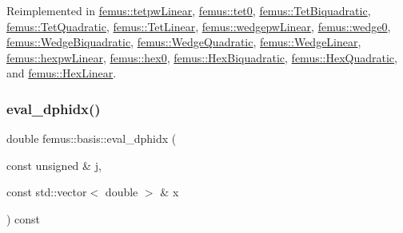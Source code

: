Reimplemented in \mbox{\hyperlink{classfemus_1_1tetpw_linear_a6b5280c580726c23a3d0557a95c39bd9}{femus\+::tetpw\+Linear}}, \mbox{\hyperlink{classfemus_1_1tet0_ab082238423f56a4a4810554511f5feb1}{femus\+::tet0}}, \mbox{\hyperlink{classfemus_1_1_tet_biquadratic_a88998aa6e589aa3919cde8c5eb1ad46d}{femus\+::\+Tet\+Biquadratic}}, \mbox{\hyperlink{classfemus_1_1_tet_quadratic_a5b0f085e16cb9e4aa9dec091d7abeed9}{femus\+::\+Tet\+Quadratic}}, \mbox{\hyperlink{classfemus_1_1_tet_linear_ad4fe543f5c2bd7fe70d3f8b0d11ddac7}{femus\+::\+Tet\+Linear}}, \mbox{\hyperlink{classfemus_1_1wedgepw_linear_a1857628ada7c64496f95bafffd40881b}{femus\+::wedgepw\+Linear}}, \mbox{\hyperlink{classfemus_1_1wedge0_a7ca29b396daf72718fc2a700b52410f0}{femus\+::wedge0}}, \mbox{\hyperlink{classfemus_1_1_wedge_biquadratic_a19df28dae2ec661641a107ae669f0f92}{femus\+::\+Wedge\+Biquadratic}}, \mbox{\hyperlink{classfemus_1_1_wedge_quadratic_a37fe1d3b6b3ec83d3f2e31319be5ba2d}{femus\+::\+Wedge\+Quadratic}}, \mbox{\hyperlink{classfemus_1_1_wedge_linear_aaaf11342fc350204f931c19b8241c913}{femus\+::\+Wedge\+Linear}}, \mbox{\hyperlink{classfemus_1_1hexpw_linear_a05244a29bbca8fae4a87d97f5306d4a0}{femus\+::hexpw\+Linear}}, \mbox{\hyperlink{classfemus_1_1hex0_a7ccc33fa4e1701fbbae72b174c7ca4f1}{femus\+::hex0}}, \mbox{\hyperlink{classfemus_1_1_hex_biquadratic_a80b2ad19492b390c105682b7d976bbb6}{femus\+::\+Hex\+Biquadratic}}, \mbox{\hyperlink{classfemus_1_1_hex_quadratic_a327ecb8081384ae254b7c74ac70478ce}{femus\+::\+Hex\+Quadratic}}, and \mbox{\hyperlink{classfemus_1_1_hex_linear_ae820d40b10b5e402a249f615e4b5f7da}{femus\+::\+Hex\+Linear}}.

\mbox{\label{classfemus_1_1basis_af1cfe0c84a3a4b1e17b5903275410340}} 
\subsubsection{\texorpdfstring{eval\+\_\+dphidx()}{eval\_dphidx()}\hspace{0.1cm}{\footnotesize\ttfamily [1/2]}}
{\footnotesize\ttfamily double femus\+::basis\+::eval\+\_\+dphidx (\begin{DoxyParamCaption}\item[{const unsigned \&}]{j,  }\item[{const std\+::vector$<$ double $>$ \&}]{x }\end{DoxyParamCaption}) const\hspace{0.3cm}{\ttfamily [inline]}}

